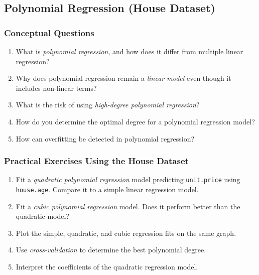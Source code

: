 \documentclass[
  11pt,
]{book}
\newcommand{\passthrough}[1]{#1}
\providecommand{\tightlist}{%
  \setlength{\itemsep}{0pt}\setlength{\parskip}{0pt}}
\theoremstyle{definition}
\theoremstyle{definition}
\theoremstyle{definition}
\theoremstyle{definition}
\theoremstyle{remark}
\begin{document}
\subsection*{Polynomial Regression (House Dataset)}\label{polynomial-regression-house-dataset}


\subsubsection*{Conceptual Questions}\label{conceptual-questions-7}


\begin{enumerate}
\def\labelenumi{\arabic{enumi}.}
\setcounter{enumi}{24}
\tightlist
\item
  What is \emph{polynomial regression}, and how does it differ from multiple linear regression?\\
\item
  Why does polynomial regression remain a \emph{linear model} even though it includes non-linear terms?\\
\item
  What is the risk of using \emph{high-degree polynomial regression}?\\
\item
  How do you determine the optimal degree for a polynomial regression model?\\
\item
  How can overfitting be detected in polynomial regression?
\end{enumerate}

\subsubsection*{Practical Exercises Using the House Dataset}\label{practical-exercises-using-the-house-dataset-1}


\begin{enumerate}
\def\labelenumi{\arabic{enumi}.}
\setcounter{enumi}{29}
\tightlist
\item
  Fit a \emph{quadratic polynomial regression} model predicting \passthrough{\lstinline!unit.price!} using \passthrough{\lstinline!house.age!}. Compare it to a simple linear regression model.\\
\item
  Fit a \emph{cubic polynomial regression} model. Does it perform better than the quadratic model?\\
\item
  Plot the simple, quadratic, and cubic regression fits on the same graph.\\
\item
  Use \emph{cross-validation} to determine the best polynomial degree.\\
\item
  Interpret the coefficients of the quadratic regression model.
\end{enumerate}
\end{document}
